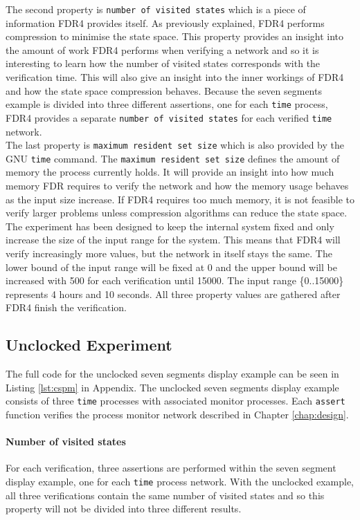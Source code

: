 The second property is \texttt{number of visited states} which is a piece of information FDR4 provides itself.
As previously explained, FDR4 performs compression to minimise the state space.
This property provides an insight into the amount of work FDR4 performs when verifying a network and so it is interesting to learn how the number of visited states corresponds with the verification time. This will also give an insight into the inner workings of FDR4 and how the state space compression behaves.
Because the seven segments example is divided into three different assertions, one for each \texttt{time} process, FDR4 provides a separate \texttt{number of visited states} for each verified \texttt{time} network. \\

The last property is \texttt{maximum resident set size} which is also provided by the GNU \texttt{time} command. The \texttt{maximum resident set size} defines the amount of memory the process currently holds. It will provide an insight into how much memory FDR requires to verify the network and how the memory usage behaves as the input size increase. If FDR4 requires too much memory, it is not feasible to verify larger problems unless compression algorithms can reduce the state space. \\

The experiment has been designed to keep the internal system fixed and only increase the size of the input range for the system. This means that FDR4 will verify increasingly more values, but the network in itself stays the same.
The lower bound of the input range will be fixed at 0 and the upper bound will be increased with 500 for each verification until 15000. The input range \{0..15000\} represents 4 hours and 10 seconds. All three property values are gathered after FDR4 finish the verification.
\subsection{Unclocked Experiment}
The full code for the unclocked seven segments display example can be seen in Listing \ref{lst:cspm} in Appendix. %
The unclocked seven segments display example consists of three \texttt{time} processes with associated monitor processes. Each \texttt{assert} function verifies the process monitor network described in Chapter \ref{chap:design}.
\paragraph{Number of visited states}
For each verification, three assertions are performed within the seven segment display example, one for each \texttt{time} process network. With the unclocked example, all three verifications contain the same number of visited states and so this property will not be divided into three different results.\\

